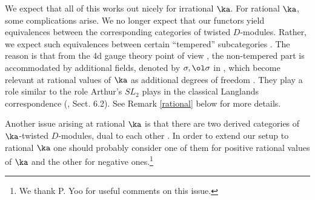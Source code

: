 \documentclass[11pt,reqno]{amsart}
\theoremstyle{plain}
\numberwithin{equation}{section}
\theoremstyle{definition}
\begin{document}
We expect that all of this works out nicely for irrational $\ka$. For
rational $\ka$, some complications arise. We no longer expect that our
functors yield equivalences between the corresponding categories of
twisted $D$-modules. Rather, we expect such equivalences between
certain ``tempered'' subcategories \cite{AG}. The reason is that from
the 4d gauge theory point of view \cite{GW1,GW2}, the non-tempered
part is accommodated by additional fields, denoted by $\sigma,
\ol\sigma$ in \cite{KW}, which become relevant at rational values of
$\ka$ as additional degrees of freedom \cite{EY2}. They play a role
similar to the role Arthur's $SL_2$ plays in the classical Langlands
correspondence (\cite{F:bourbaki}, Sect. 6.2). See Remark
\ref{rational} below for more details.

Another issue arising at rational $\ka$ is that there are two derived
categories of $\ka$-twisted $D$-modules, dual to each other
\cite{DG}. In order to extend our setup to rational $\ka$ one should
probably consider one of them for positive rational values of $\ka$
and the other for negative ones.\footnote{We thank P. Yoo for useful
  comments on this issue.}



\end{document}
